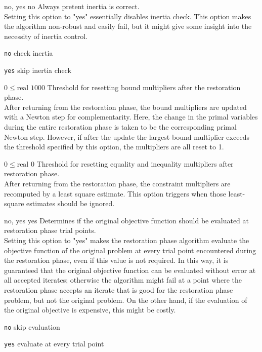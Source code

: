 %
{\ttfamily no, yes}%
{no}%
{Always pretent inertia is correct.\\
Setting this option to "yes" essentially disables inertia check. This option makes the algorithm non-robust and easily fail, but it might give some insight into the necessity of inertia control.}%
{\begin{list}{}{
\setlength{\parsep}{0em}
\setlength{\leftmargin}{5ex}
\setlength{\labelwidth}{2ex}
\setlength{\itemindent}{0ex}
\setlength{\topsep}{0pt}}
\item[\texttt{no}] check inertia
\item[\texttt{yes}] skip inertia check
\end{list}
}

%
{$0\leq\textrm{real}$}%
{$1000$}%
{Threshold for resetting bound multipliers after the restoration phase.\\
After returning from the restoration phase, the bound multipliers are updated with a Newton step for complementarity.  Here, the change in the primal variables during the entire restoration phase is taken to be the corresponding primal Newton step. However, if after the update the largest bound multiplier exceeds the threshold specified by this option, the multipliers are all reset to 1.}%
{}

%
{$0\leq\textrm{real}$}%
{$0$}%
{Threshold for resetting equality and inequality multipliers after restoration phase.\\
After returning from the restoration phase, the constraint multipliers are recomputed by a least square estimate.  This option triggers when those least-square estimates should be ignored.}%
{}

%
{\ttfamily no, yes}%
{yes}%
{Determines if the original objective function should be evaluated at restoration phase trial points.\\
Setting this option to "yes" makes the restoration phase algorithm evaluate the objective function of the original problem at every trial point encountered during the restoration phase, even if this value is not required.  In this way, it is guaranteed that the original objective function can be evaluated without error at all accepted iterates; otherwise the algorithm might fail at a point where the restoration phase accepts an iterate that is good for the restoration phase problem, but not the original problem.  On the other hand, if the evaluation of the original objective is expensive, this might be costly.}%
{\begin{list}{}{
\setlength{\parsep}{0em}
\setlength{\leftmargin}{5ex}
\setlength{\labelwidth}{2ex}
\setlength{\itemindent}{0ex}
\setlength{\topsep}{0pt}}
\item[\texttt{no}] skip evaluation
\item[\texttt{yes}] evaluate at every trial point
\end{list}
}

